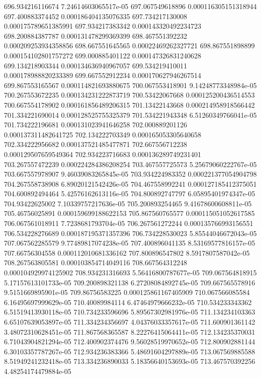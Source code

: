 {696.934216116674 7.24614603065517e-05
697.067549618896 0.000116305151318944
697.400883374452 0.000186404135076335
697.734217130008 0.000175789651385991
697.934217383342 0.000143320492234723
698.200884387787 0.000131478299369399
698.467551392232 0.000209253934358856
698.667551645565 0.00022469262327721
698.867551898899 0.000154102801757272
699.000885401122 0.000147326831240628
699.134218903344 0.000134636940967057
699.534219410011 0.000178988820233389
699.667552912234 0.000170627946267514
699.867553165567 0.000114821693880675
700.067553418901 9.14248773348984e-05
700.267553672235 0.000134231222873719
700.53422067668 0.000125200436514553
700.667554178902 0.000161856489206315
701.13422143668 0.000214958918566442
701.334221690014 0.000128525755325379
701.534221943348 6.51260349766041e-05
701.734222196681 0.000131023941646258
702.000889201126 0.000137311482641725
702.134222703349 0.000165053305640658
702.334222956682 0.000137521485477871
702.667556712238 0.000129507659549364
702.934223716683 0.000136289749231401
703.267557472239 0.000224284386208254
703.467557725573 5.25679060222767e-05
703.667557978907 9.46039083265845e-05
703.934224983352 0.000221377054904798
704.267558738908 6.89020121542426e-05
704.467558992241 0.000127185412375051
704.600892494464 5.42576162613116e-05
704.800892747797 6.05895401974347e-05
704.93422625002 7.10339757217636e-05
705.200893254465 9.41678600608811e-05
705.46756025891 0.000159699188622153
705.867560765577 0.000115051052617585
706.067561018911 7.7238681793704e-05
706.267561272244 0.000135766993156551
706.534228276689 0.000187195371357396
706.734228530023 5.85544046672043e-05
707.067562285579 9.77489817074238e-05
707.400896041135 8.53169577816157e-05
707.66756304558 0.000112010681336162
707.800896547802 8.5917807587042e-05
708.267563805581 0.000103854714049116
708.667564312248 0.000104929974125902
708.934231316693 5.56416800787677e-05
709.067564818915 5.17157613101733e-05
709.200898321138 6.27208084892745e-05
709.667565578916 9.5151669895901e-05
709.86756583225 0.000125861167405909
710.067566085584 6.16495697999629e-05
710.40089984114 6.47464979666232e-05
710.534233343362 6.51519413930118e-05
710.734233596696 5.89567302981976e-05
711.134234103363 6.65107639053897e-05
711.334234356697 4.04376033357617e-05
711.600901361142 3.48072310628451e-05
711.867568365587 8.22276415064411e-05
712.134235370031 6.71043904821294e-05
712.400902374476 9.56028519970652e-05
712.800902881144 6.30103357787267e-05
712.934236383366 5.48691604297889e-05
713.067569885588 8.51949241232418e-05
713.334236890033 5.18356640153693e-05
713.467570392256 4.48254174479884e-05
}
